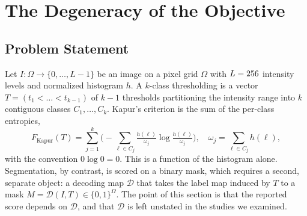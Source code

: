 %
%
\section{The Degeneracy of the Objective}
\label{sec:degeneracy}

\subsection{Problem Statement}

Let $I:\Omega\to\{0,\dots,L-1\}$ be an image on a pixel grid $\Omega$ with
$L=256$ intensity levels and normalized histogram $h$. A $k$-class
thresholding is a vector $T=(t_1<\dots<t_{k-1})$ of $k-1$ thresholds partitioning
the intensity range into $k$ contiguous classes $C_1,\dots,C_k$. Kapur's
criterion is the sum of the per-class entropies,
\begin{equation}
F_{\mathrm{Kapur}}(T)=\sum_{j=1}^{k}\Big(-\sum_{\ell\in C_j}
\tfrac{h(\ell)}{\omega_j}\log\tfrac{h(\ell)}{\omega_j}\Big),\quad
\omega_j=\sum_{\ell\in C_j} h(\ell),
\end{equation}
with the convention $0\log 0=0$. This is a function of the histogram alone.
Segmentation, by contrast, is scored on a binary mask, which requires a second,
separate object: a decoding map $\mathcal{D}$ that takes the label map induced by
$T$ to a mask $M=\mathcal{D}(I,T)\in\{0,1\}^{\Omega}$. The point of this section
is that the reported score depends on $\mathcal{D}$, and that $\mathcal{D}$ is
left unstated in the studies we examined.

